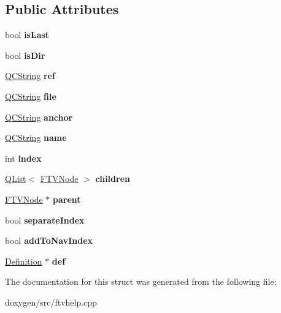 \subsection*{Public Attributes}
\begin{DoxyCompactItemize}
\item 
\mbox{\label{struct_f_t_v_node_a372062c2fc8595d96798765ae195556d}} 
bool {\bfseries is\+Last}
\item 
\mbox{\label{struct_f_t_v_node_aa9ffc5909967a0bfe9170e45f6117c64}} 
bool {\bfseries is\+Dir}
\item 
\mbox{\label{struct_f_t_v_node_a71d6d3927c045809ce5fcb6cf15da3d9}} 
\mbox{\hyperlink{class_q_c_string}{Q\+C\+String}} {\bfseries ref}
\item 
\mbox{\label{struct_f_t_v_node_a9e70cf96146fd5fda79891bdbd45082a}} 
\mbox{\hyperlink{class_q_c_string}{Q\+C\+String}} {\bfseries file}
\item 
\mbox{\label{struct_f_t_v_node_a9a78c56961b2ea3b97249a149bced5ad}} 
\mbox{\hyperlink{class_q_c_string}{Q\+C\+String}} {\bfseries anchor}
\item 
\mbox{\label{struct_f_t_v_node_aa805d89320be25581ff3dcfed7f0c903}} 
\mbox{\hyperlink{class_q_c_string}{Q\+C\+String}} {\bfseries name}
\item 
\mbox{\label{struct_f_t_v_node_abc09d6f0f31ec0b09b775da0814ef904}} 
int {\bfseries index}
\item 
\mbox{\label{struct_f_t_v_node_a5e924e9ea4e2d29721bc391b83d5b73a}} 
\mbox{\hyperlink{class_q_list}{Q\+List}}$<$ \mbox{\hyperlink{struct_f_t_v_node}{F\+T\+V\+Node}} $>$ {\bfseries children}
\item 
\mbox{\label{struct_f_t_v_node_a65ba33768f767c0d634cc94a251f4f9c}} 
\mbox{\hyperlink{struct_f_t_v_node}{F\+T\+V\+Node}} $\ast$ {\bfseries parent}
\item 
\mbox{\label{struct_f_t_v_node_a1f979a212a1251b75ec4a06c1ddeafb4}} 
bool {\bfseries separate\+Index}
\item 
\mbox{\label{struct_f_t_v_node_a53c74b2ed0c6f5e54541fcaf086008ed}} 
bool {\bfseries add\+To\+Nav\+Index}
\item 
\mbox{\label{struct_f_t_v_node_af7ef22a268ee00d12a6989c89a66823e}} 
\mbox{\hyperlink{class_definition}{Definition}} $\ast$ {\bfseries def}
\end{DoxyCompactItemize}


The documentation for this struct was generated from the following file\+:\begin{DoxyCompactItemize}
\item 
doxygen/src/ftvhelp.\+cpp\end{DoxyCompactItemize}
